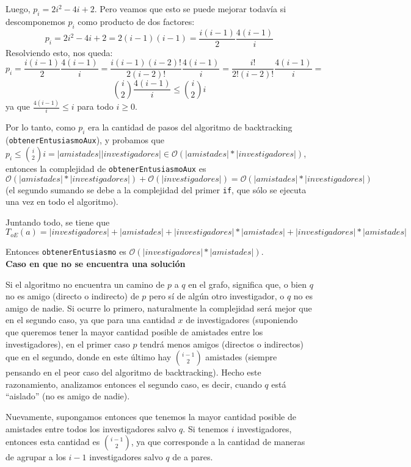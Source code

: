 \documentclass[12pt, a4paper,english,spanish]{article}
\begin{document}
\begin{itemize}
Luego, $p_i = 2i^2-4i+2$. Pero veamos que esto se puede mejorar todav\'ia si descomponemos $p_i$ como producto de dos factores: $$p_i = 2i^2-4i+2 = 2(i-1)(i-1) = \frac{i(i-1)}{2} \frac{4(i-1)}{i} $$ Resolviendo esto, nos queda: $$p_i = \frac{i(i-1)}{2} \frac{4(i-1)}{i} = \frac{i(i-1)(i-2)!}{2(i-2)!} \frac{4(i-1)}{i} = \frac{i!}{2! (i-2)!} \frac{4(i-1)}{i} =$$ $$ \binom{i}{2} \frac{4(i-1)}{i} \leq \binom{i}{2} i$$ ya que $\frac{4(i-1)}{i} \leq i$ para todo $i \geq 0$.

Por lo tanto, como $p_i$ era la cantidad de pasos del algoritmo de backtracking (\texttt{obtenerEntusiasmoAux}), y probamos que $p_i \leq \binom{i}{2} i = |amistades| |investigadores| \in \mathcal{O}(|amistades| * |investigadores|)$, entonces la complejidad de \texttt{obtenerEntusiasmoAux} es $\mathcal{O}(|amistades| * |investigadores|) + \mathcal{O}(|investigadores|) = \mathcal{O}(|amistades| * |investigadores|)$ (el segundo sumando se debe a la complejidad del primer \texttt{if}, que s\'olo se ejecuta una vez en todo el algoritmo).

Juntando todo, se tiene que $T_{oE}(a) = |investigadores| + |amistades| + |investigadores| * |amistades| + |investigadores| * |amistades|$

Entonces \texttt{obtenerEntusiasmo} es $\mathcal{O}(|investigadores| * |amistades|)$.   \\


\textbf{Caso en que no se encuentra una soluci\'on} 

Si el algoritmo no encuentra un camino de $p$ a $q$ en el grafo, significa que, o bien $q$ no es amigo (directo o indirecto) de $p$ pero s\'i de alg\'un otro investigador, o $q$ no es amigo de nadie. Si ocurre lo primero, naturalmente la complejidad ser\'a mejor que en el segundo caso, ya que para una cantidad $x$ de investigadores (suponiendo que queremos tener la mayor cantidad posible de amistades entre los investigadores), en el primer caso $p$ tendr\'a menos amigos (directos o indirectos) que en el segundo, donde en este \'ultimo hay $\binom{i-1}{2}$ amistades (siempre pensando en el peor caso del algoritmo de backtracking). Hecho este razonamiento, analizamos entonces el segundo caso, es decir, cuando $q$ est\'a ``aislado'' (no es amigo de nadie).

Nuevamente, supongamos entonces que tenemos la mayor cantidad posible de amistades entre todos los investigadores salvo $q$. Si tenemos $i$ investigadores, entonces esta cantidad es $\binom{i-1}{2}$, ya que corresponde a la cantidad de maneras de agrupar a los $i-1$ investigadores salvo $q$ de a pares. 


\end{itemize}
\end{document}
